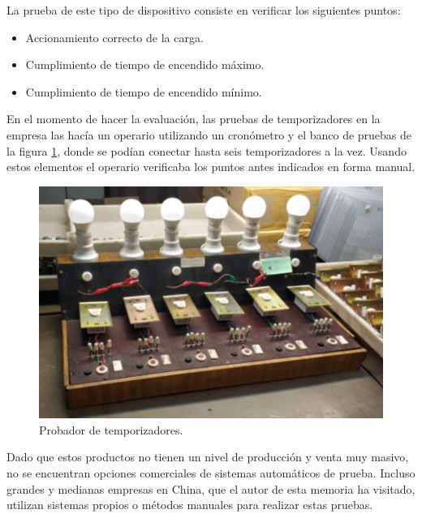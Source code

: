 

La prueba de este tipo de dispositivo consiste en verificar los siguientes puntos:

\begin{itemize}
	\item Accionamiento correcto de la carga.
	\item Cumplimiento de tiempo de encendido máximo.
	\item Cumplimiento de tiempo de encendido mínimo.
\end{itemize}

En el momento de hacer la evaluación, las pruebas de temporizadores en la empresa las hacía un operario utilizando un cronómetro y el banco de pruebas de la figura \ref{fig:Probador}, donde se podían conectar hasta seis temporizadores a la vez. Usando estos elementos el operario verificaba los puntos antes indicados en forma manual.

\begin{figure}[ht]
	\centering
	\includegraphics[scale=.7]{./Figures/Probador.png}
	\caption{Probador de temporizadores.}
	\label{fig:Probador}
\end{figure}

Dado que estos productos no tienen un nivel de producción y venta muy masivo, no se encuentran opciones comerciales de sistemas automáticos de prueba. Incluso grandes y medianas empresas en China, que el autor de esta memoria ha visitado, utilizan sistemas propios o métodos manuales para realizar estas pruebas.


